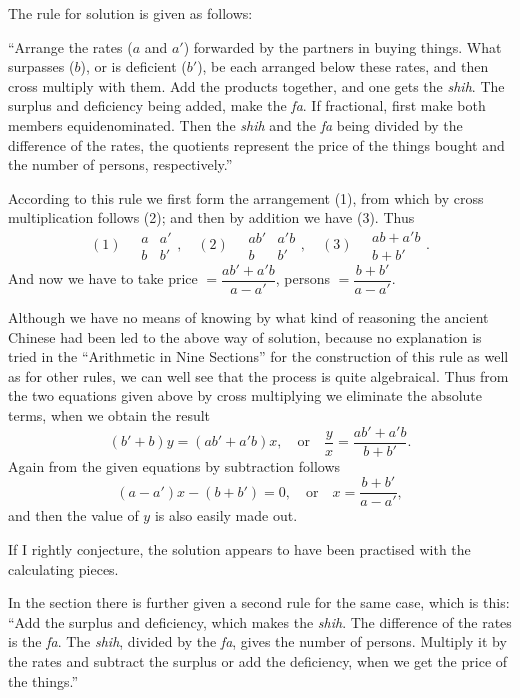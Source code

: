 \documentclass[11pt]{article}
\newcommand{\scanpage}[2]{\clearpage\setcounter{footnote}{0}\noindent{\footnotesize\color{gray}PDF page #1 · #2}\par\medskip}
\newcommand{\scanfooter}{}
\begin{document}
The rule for solution is given as follows:

``Arrange the rates ($a$ and $a'$) forwarded by the partners in buying things. What surpasses ($b$), or is deficient ($b'$), be each arranged below these rates, and then cross multiply with them. Add the products together, and one gets the \emph{shih}. The surplus and deficiency being added, make the \emph{fa}. If fractional, first make both members equidenominated. Then the \emph{shih} and the \emph{fa} being divided by the difference of the rates, the quotients represent the price of the things bought and the number of persons, respectively.''

According to this rule we first form the arrangement (1), from which by cross multiplication follows (2); and then by addition we have (3). Thus
\[
(1)\quad \begin{array}{cc}a&a'\\ b&b'\end{array},\quad
(2)\quad \begin{array}{cc}ab'&a'b\\ b&b'\end{array},\quad
(3)\quad \begin{array}{c}ab+a'b\\ b+b'\end{array}.
\]
And now we have to take price $=\dfrac{ab'+a'b}{a-a'}$, persons $=\dfrac{b+b'}{a-a'}$.
\scanfooter

\scanpage{0031}{Chapter 3, printed page 17}
Although we have no means of knowing by what kind of reasoning the ancient Chinese had been led to the above way of solution, because no explanation is tried in the ``Arithmetic in Nine Sections'' for the construction of this rule as well as for other rules, we can well see that the process is quite algebraical. Thus from the two equations given above by cross multiplying we eliminate the absolute terms, when we obtain the result
\[
(b'+b)y=(ab'+a'b)x,\quad \text{or}\quad \frac yx=\frac{ab'+a'b}{b+b'}.
\]
Again from the given equations by subtraction follows
\[
(a-a')x-(b+b')=0,\quad \text{or}\quad x=\frac{b+b'}{a-a'},
\]
and then the value of $y$ is also easily made out.

If I rightly conjecture, the solution appears to have been practised with the calculating pieces.

In the section there is further given a second rule for the same case, which is this: ``Add the surplus and deficiency, which makes the \emph{shih}. The difference of the rates is the \emph{fa}. The \emph{shih}, divided by the \emph{fa}, gives the number of persons. Multiply it by the rates and subtract the surplus or add the deficiency, when we get the price of the things.''
\end{document}
